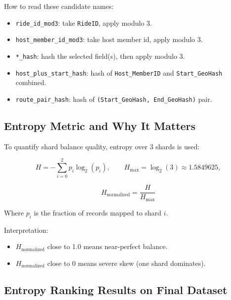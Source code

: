 \documentclass[12pt]{article}
\begin{document}
How to read these candidate names:
\begin{itemize}
    \item \texttt{ride\_id\_mod3}: take \texttt{RideID}, apply modulo 3.
    \item \texttt{host\_member\_id\_mod3}: take host member id, apply modulo 3.
    \item \texttt{*\_hash}: hash the selected field(s), then apply modulo 3.
    \item \texttt{host\_plus\_start\_hash}: hash of \texttt{Host\_MemberID} and \texttt{Start\_GeoHash} combined.
    \item \texttt{route\_pair\_hash}: hash of \texttt{(Start\_GeoHash, End\_GeoHash)} pair.
\end{itemize}

\subsection{Entropy Metric and Why It Matters}

To quantify shard balance quality, entropy over 3 shards is used:

\[
H = -\sum_{i=0}^{2} p_i\log_2(p_i),\qquad
H_{\max} = \log_2(3) \approx 1.5849625,
\]

\[
H_{\text{normalized}} = \frac{H}{H_{\max}}
\]

Where $p_i$ is the fraction of records mapped to shard $i$.

Interpretation:
\begin{itemize}
    \item $H_{\text{normalized}}$ close to 1.0 means near-perfect balance.
    \item $H_{\text{normalized}}$ close to 0 means severe skew (one shard dominates).
\end{itemize}

\subsection{Entropy Ranking Results on Final Dataset}
\end{document}
